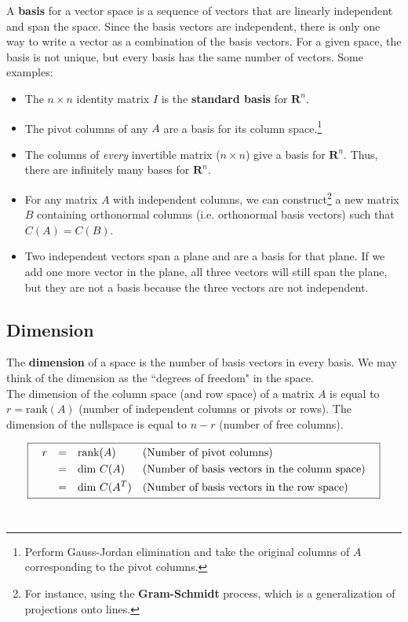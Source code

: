 \documentclass[11pt]{article}
\theoremstyle{plain}
\theoremstyle{definition}
\theoremstyle{remark}
\numberwithin{equation}{section}
\begin{document}
A {\bf basis} for a vector space is a sequence of vectors that are linearly independent and span the space. Since the basis vectors are independent, there is only one way to write a vector as a combination of the basis vectors. For a given space, the basis is not unique, but every basis has the same number of vectors. Some examples:
\begin{itemize}[noitemsep] %
\item The $n \times n$ identity matrix $I$ is the {\bf standard basis} for $\mathbf{R}^n$.
\item The pivot columns of any $A$ are a basis for its column space.\footnote{Perform Gauss-Jordan elimination and take the original columns of $A$ corresponding to the pivot columns.}
\item The columns of {\em every} invertible matrix ($n \times n$) give a basis for $\mathbf{R}^n$. Thus, there are infinitely many bases for $\mathbf{R}^n$.
\item For any matrix $A$ with independent columns, we can construct\footnote{For instance, using the {\bf Gram-Schmidt} process, which is a generalization of projections onto lines.} a new matrix $B$ containing orthonormal columns (i.e. orthonormal basis vectors) such that $C(A) = C(B)$. 
\item Two independent vectors span a plane and are a basis for that plane. If we add one more vector in the plane, all three vectors will still span the plane, but they are not a basis because the three vectors are not independent.
\end{itemize}



\subsection{Dimension}

The {\bf dimension}  of a space is the number of basis vectors in every basis. We may think of the dimension as the ``degrees of freedom" in the space.
\\

The dimension of the column space (and row space) of a matrix $A$ is equal to $r = \text{rank}(A)$ (number of independent columns or pivots or rows). The dimension of the nullspace is equal to $n-r$ (number of free columns).


\[
\boxed{
\begin{aligned}
& \quad r & = & \quad \text{rank}(A) & &\text{(Number of pivot columns)} & \\
& & = & \quad \text{dim} \ C(A) & &\text{(Number of basis vectors in the column space)} & \\
& & = & \quad \text{dim} \ C(A^T) & &\text{(Number of basis vectors in the row space)} & 
\end{aligned}
}
\]
\
\end{document}
